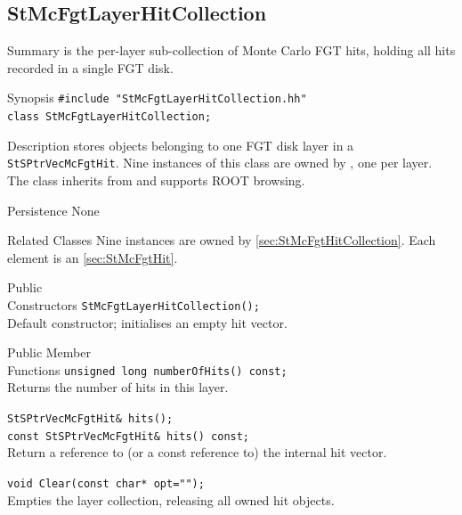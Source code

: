 \subsection{StMcFgtLayerHitCollection}
 
\label{sec:StMcFgtLayerHitCollection}
\begin{Entry}
\item[Summary]
     is the per-layer sub-collection of
    Monte Carlo FGT hits, holding all hits recorded in a single FGT disk.

\item[Synopsis]
    \verb+#include "StMcFgtLayerHitCollection.hh"+\\
    \verb+class StMcFgtLayerHitCollection;+\\

\item[Description]
     stores  objects
    belonging to one FGT disk layer in a
    \verb+StSPtrVecMcFgtHit+.  Nine instances of this class are owned
    by , one per layer.  The class inherits
    from  and supports ROOT browsing.

\item[Persistence]
    None

\item[Related Classes]
    Nine instances are owned by 
    \ref{sec:StMcFgtHitCollection}.
    Each element is an  \ref{sec:StMcFgtHit}.

\item[Public\\ Constructors]
    \verb+StMcFgtLayerHitCollection();+\\
    Default constructor; initialises an empty hit vector.

\item[Public Member\\ Functions]
    \verb+unsigned long numberOfHits() const;+\\
    Returns the number of hits in this layer.

    \verb+StSPtrVecMcFgtHit& hits();+\\
    \verb+const StSPtrVecMcFgtHit& hits() const;+\\
    Return a reference to (or a const reference to) the internal hit vector.

    \verb+void Clear(const char* opt="");+\\
    Empties the layer collection, releasing all owned hit objects.

\end{Entry}
\clearpage
%
%
